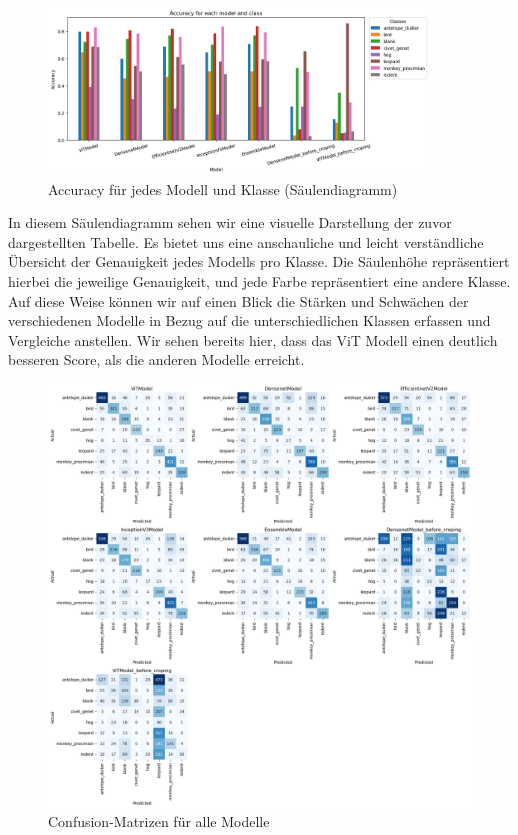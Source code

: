 \documentclass{article}
\begin{document}
\begin{figure}[!h]
    \centering
    \includegraphics[width=0.9\textwidth]{plots/Accuracy_Barplot.png}
    \caption{\label{fig:accuracy_barplot}Accuracy für jedes Modell und Klasse (Säulendiagramm)}
\end{figure}

In diesem Säulendiagramm sehen wir eine visuelle Darstellung der zuvor dargestellten Tabelle. Es bietet uns eine anschauliche und leicht verständliche Übersicht der Genauigkeit jedes Modells pro Klasse. Die Säulenhöhe repräsentiert hierbei die jeweilige Genauigkeit, und jede Farbe repräsentiert eine andere Klasse. Auf diese Weise können wir auf einen Blick die Stärken und Schwächen der verschiedenen Modelle in Bezug auf die unterschiedlichen Klassen erfassen und Vergleiche anstellen. Wir sehen bereits hier, dass das ViT Modell einen deutlich besseren Score, als die anderen Modelle erreicht.

\newpage

\begin{figure}[!h]
    \centering
    \includegraphics[width=1\textwidth]{plots/Confusionmatrix.png}
    \caption{\label{fig:confusion_matrix}Confusion-Matrizen für alle Modelle}
\end{figure}
\end{document}

